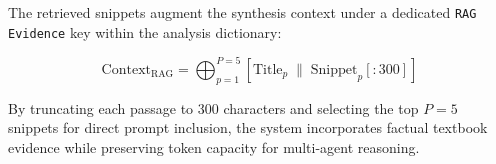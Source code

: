 The retrieved snippets augment the synthesis context under a dedicated \texttt{RAG Evidence} key within the analysis dictionary:

\begin{equation}
    \text{Context}_{\text{RAG}} = \bigoplus_{p=1}^{P=5} \left[ \text{Title}_p \;\|\; \text{Snippet}_p[:300] \right]
\end{equation}

By truncating each passage to 300 characters and selecting the top $P=5$ snippets for direct prompt inclusion, the system incorporates factual textbook evidence while preserving token capacity for multi-agent reasoning.
